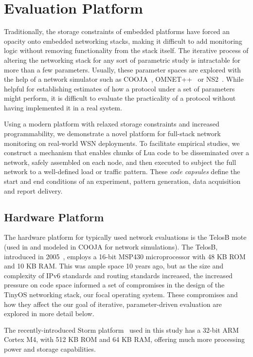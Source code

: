 \section{Evaluation Platform}

Traditionally, the storage constraints of embedded platforms have forced an opacity onto embedded networking stacks, making it difficult to add monitoring logic without removing functionality from the stack itself.
The iterative process of altering the networking stack for any sort of parametric study is intractable for more than a few parameters.
Usually, these parameter spaces are explored with the help of a network simulator such as COOJA~\cite{cooja}, OMNET++~\cite{omnet++} or NS2~\cite{ns2}.
While helpful for establishing estimates of how a protocol under a set of parameters might perform, it is difficult to evaluate the practicality of a protocol without having implemented it in a real system.

Using a modern platform with relaxed storage constraints and increased programmability, we demonstrate a novel platform for full-stack network monitoring on real-world WSN deployments.
To facilitate empirical studies, we construct a mechanism that enables chunks of Lua code to be disseminated over a network, safely assembled on each node, and then executed to subject the full network to a well-defined load or traffic pattern. 
These \emph{code capsules} define the start and end conditions of an experiment, pattern generation, data acquisition and report delivery. 

\subsection{Hardware Platform}

The hardware platform for typically used network evaluations is the TelosB mote (used in \cite{ko2011evaluating} and modeled in COOJA for network simulations).
The TelosB, introduced in 2005~\cite{polastre2005telos},  employs a 16-bit MSP430 microprocessor with 48 KB ROM and 10 KB RAM.
This was ample space 10 years ago, but as the size and complexity of IPv6 standards and routing standards increased, the increased pressure on code space informed a set of compromises in the design of the TinyOS networking stack, our focal operating system.
These compromises and how they affect the our goal of iterative, parameter-driven evaluation are explored in more detail below.

The recently-introduced Storm platform~\cite{andersen2016system} used in this study has a 32-bit ARM Cortex M4, with 512 KB ROM and 64 KB RAM, offering much more processing power and storage capabilities.

